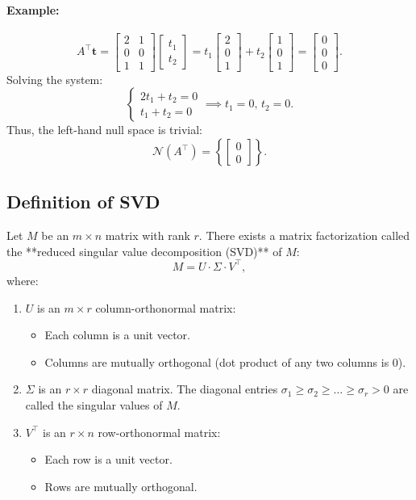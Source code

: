 \documentclass{article}
\begin{document}
\paragraph*{Example:}
\[
A^\top \mathbf{t} = \begin{bmatrix}
    2 & 1 \\
    0 & 0 \\
    1 & 1
\end{bmatrix}
\begin{bmatrix}
    t_1 \\
    t_2
\end{bmatrix}
= t_1\begin{bmatrix}2 \\ 0 \\ 1\end{bmatrix} 
+ t_2\begin{bmatrix}1 \\ 0 \\ 1\end{bmatrix} 
= \begin{bmatrix}0 \\ 0 \\ 0\end{bmatrix}.
\]
Solving the system:
\[
\begin{cases}
2t_1 + t_2 = 0 \\
t_1 + t_2 = 0
\end{cases} \implies t_1 = 0,\, t_2 = 0.
\]
Thus, the left-hand null space is trivial:
\[
\mathcal{N}(A^\top) = \left\{ \begin{bmatrix}0 \\ 0\end{bmatrix} \right\}.
\]

\subsection{Definition of SVD}
Let \( M \) be an \( m \times n \) matrix with rank \( r \). There exists a matrix factorization called the **reduced singular value decomposition (SVD)** of \( M \):
\[
M = U \cdot \Sigma \cdot V^\top,
\]
where:
\begin{enumerate}
    \item \( U \) is an \( m \times r \) column-orthonormal matrix:
    \begin{itemize}
        \item Each column is a unit vector.
        \item Columns are mutually orthogonal (dot product of any two columns is 0).
    \end{itemize}
    \item \( \Sigma \) is an \( r \times r \) diagonal matrix. The diagonal entries \( \sigma_1 \geq \sigma_2 \geq \dots \geq \sigma_r > 0 \) are called the singular values of \( M \).
    \item \( V^\top \) is an \( r \times n \) row-orthonormal matrix:
    \begin{itemize}
        \item Each row is a unit vector.
        \item Rows are mutually orthogonal.
    \end{itemize}
\end{enumerate}
\end{document}
